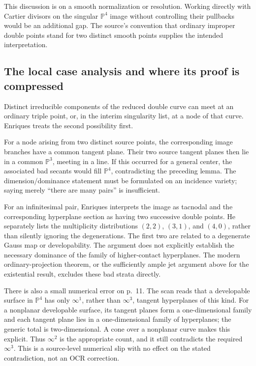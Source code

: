 This discussion is on a smooth normalization or resolution. Working directly with Cartier divisors on the singular \(\mathbb P^4\) image without controlling their pullbacks would be an additional gap. The source's convention that ordinary improper double points stand for two distinct smooth points supplies the intended interpretation.

\subsection{The local case analysis and where its proof is compressed}

Distinct irreducible components of the reduced double curve can meet at an ordinary triple point, or, in the interim singularity list, at a node of that curve. Enriques treats the second possibility first.

For a node arising from two distinct source points, the corresponding image branches have a common tangent plane. Their two source tangent planes then lie in a common \(\mathbb P^3\), meeting in a line. If this occurred for a general center, the associated bad secants would fill \(\mathbb P^4\), contradicting the preceding lemma. The dimension/dominance statement must be formulated on an incidence variety; saying merely ``there are many pairs'' is insufficient.

For an infinitesimal pair, Enriques interprets the image as tacnodal and the corresponding hyperplane section as having two successive double points. He separately lists the multiplicity distributions \((2,2)\), \((3,1)\), and \((4,0)\), rather than silently ignoring the degenerations. The first two are related to a degenerate Gauss map or developability. The argument does not explicitly establish the necessary dominance of the family of higher-contact hyperplanes. The modern ordinary-projection theorem, or the sufficiently ample jet argument above for the existential result, excludes these bad strata directly.

There is also a small numerical error on p.~11. The scan reads that a developable surface in \(\mathbb P^4\) has only \(\infty^1\), rather than \(\infty^3\), tangent hyperplanes of this kind. For a nonplanar developable surface, its tangent planes form a one-dimensional family and each tangent plane lies in a one-dimensional family of hyperplanes; the generic total is two-dimensional. A cone over a nonplanar curve makes this explicit. Thus \(\infty^2\) is the appropriate count, and it still contradicts the required \(\infty^3\). This is a source-level numerical slip with no effect on the stated contradiction, not an OCR correction.

